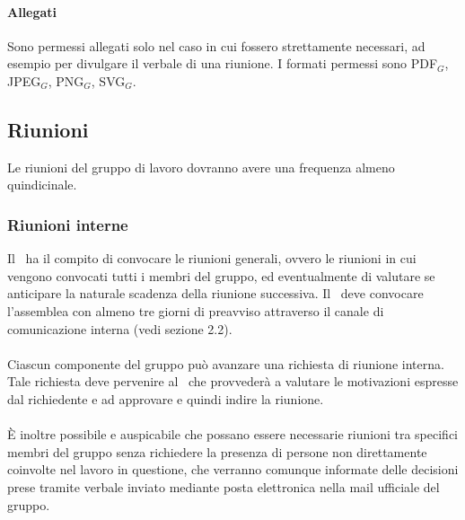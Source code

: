 \paragraph{Allegati}
Sono permessi allegati solo nel caso in cui fossero strettamente necessari, ad esempio per divulgare il verbale di una riunione. I formati permessi sono PDF$_G$, JPEG$_G$, PNG$_G$, SVG$_G$.






\subsection{Riunioni}
Le riunioni del gruppo di lavoro dovranno avere una frequenza almeno quindicinale.
\subsubsection{Riunioni interne}
Il \ruoloResponsabile\ ha il compito di convocare le riunioni generali, ovvero le riunioni in cui vengono convocati tutti i membri del gruppo, ed eventualmente di valutare se anticipare la naturale scadenza della riunione successiva. Il \ruoloResponsabile\ deve convocare l’assemblea con almeno tre giorni di preavviso attraverso il canale di comunicazione interna (vedi sezione 2.2). \\ \\
Ciascun componente del gruppo può avanzare una richiesta di riunione interna.
Tale richiesta deve pervenire al \ruoloResponsabile\ che provvederà a valutare le motivazioni espresse dal richiedente e ad approvare e quindi indire la riunione. \\ \\
È inoltre possibile e auspicabile che possano essere necessarie riunioni tra specifici membri del gruppo senza richiedere la presenza di persone non direttamente coinvolte nel lavoro in questione, che verranno comunque informate delle decisioni prese tramite verbale inviato mediante posta elettronica nella mail ufficiale del gruppo.

